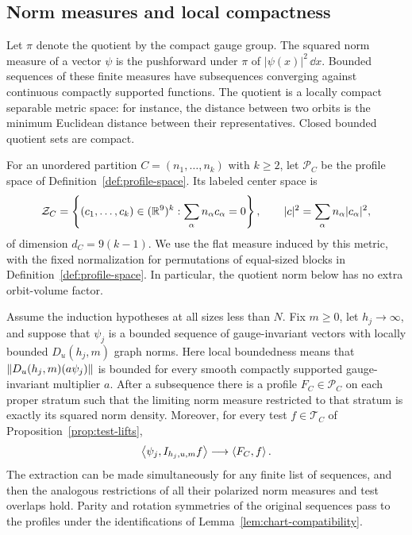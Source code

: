 \subsection{Norm measures and local compactness}

Let \(\pi\) denote the quotient by the compact gauge group. The squared
norm measure of a vector \(\psi\) is the pushforward under \(\pi\) of
\(|\psi(x)|^2\,\dd x\). Bounded sequences of these finite measures have
subsequences converging against continuous compactly supported functions.
The quotient is a locally compact separable metric space: for instance,
the distance between two orbits is the minimum Euclidean distance between
their representatives. Closed bounded quotient sets are compact.

For an unordered partition \(C=(n_1,\ldots,n_k)\) with \(k\ge2\), let
\(\mathcal P_C\) be the profile space of Definition~\ref{def:profile-space}.
Its labeled center space is
\[
 \mathcal Z_C=\left\{(c_1,\ldots,c_k)\in(\mathbb R^9)^k:
                   \sum_\alpha n_\alpha c_\alpha=0\right\},
 \qquad |c|^2=\sum_\alpha n_\alpha|c_\alpha|^2,
\]
of dimension \(d_C=9(k-1)\). We use the flat measure induced by this metric,
with the fixed normalization for permutations of equal-sized blocks in
Definition~\ref{def:profile-space}. In particular, the quotient norm below
has no extra orbit-volume factor.

\begin{proposition}
\label{prop:profile-compactness}
Assume the induction hypotheses at all sizes less than \(N\). Fix \(m\ge0\),
let \(h_j\to\infty\), and suppose that \(\psi_j\) is a bounded sequence of
gauge-invariant vectors with locally bounded \(D_u(h_j,m)\) graph norms.
Here local boundedness means that
\(\left\lVert D_u(h_j,m)(a\psi_j)\right\rVert\) is bounded for every smooth compactly
supported gauge-invariant multiplier \(a\).
After a subsequence there is a profile \(F_C\in\mathcal P_C\) on each proper
stratum such that the limiting norm measure restricted to that stratum is
exactly its squared norm density. Moreover, for every test
\(f\in\mathcal T_C\) of Proposition~\ref{prop:test-lifts},
\begin{equation}\label{prof:test-overlap}
 \left\langle \psi_j,I_{h_j,u,m}f\right\rangle\longrightarrow\left\langle F_C,f\right\rangle.
\end{equation}
The extraction can be made simultaneously for any finite list of
sequences, and then the analogous restrictions of all their polarized
norm measures and test overlaps hold. Parity and rotation symmetries of
the original sequences pass to the profiles under the identifications of
Lemma~\ref{lem:chart-compatibility}.
\end{proposition}

